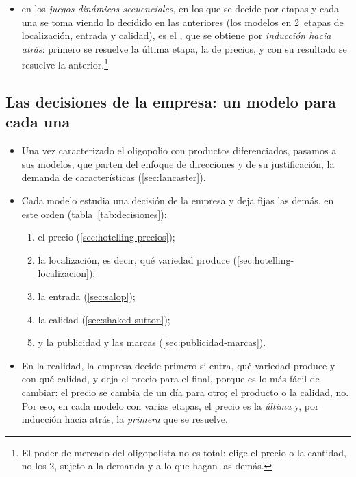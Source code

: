 \documentclass[11pt]{article}
\begin{document}
\begin{itemize}
\begin{itemize}
  \item en los \emph{juegos dinámicos secuenciales}, en los que se decide por etapas y cada una se toma viendo lo decidido en las anteriores (los modelos en 2~etapas de localización, entrada y calidad), es el , que se obtiene por \emph{inducción hacia atrás}: primero se resuelve la última etapa, la de precios, y con su resultado se resuelve la anterior.\footnote{El poder de mercado del oligopolista no es total: elige el precio o la cantidad, no los 2, sujeto a la demanda y a lo que hagan las demás.}
  \end{itemize}
\end{itemize}

\subsection{Las decisiones de la empresa: un modelo para cada una}\label{sec:decisiones}

\begin{itemize}
\item Una vez caracterizado el oligopolio con productos diferenciados, pasamos a sus modelos, que parten del enfoque de direcciones y de su justificación, la demanda de características (\ref{sec:lancaster}).
\item Cada modelo estudia una decisión de la empresa y deja fijas las demás, en este orden (tabla~\ref{tab:decisiones}):
  \begin{enumerate}
  \item el precio (\ref{sec:hotelling-precios});
  \item la localización, es decir, qué variedad produce (\ref{sec:hotelling-localizacion});
  \item la entrada (\ref{sec:salop});
  \item la calidad (\ref{sec:shaked-sutton});
  \item y la publicidad y las marcas (\ref{sec:publicidad-marcas}).
  \end{enumerate}
\item En la realidad, la empresa decide primero si entra, qué variedad produce y con qué calidad, y deja el precio para el final, porque es lo más fácil de cambiar: el precio se cambia de un día para otro; el producto o la calidad, no. Por eso, en cada modelo con varias etapas, el precio es la \emph{última} y, por inducción hacia atrás, la \emph{primera} que se resuelve\nocite{Tirole1988Theory}.
\end{itemize}
\end{document}
